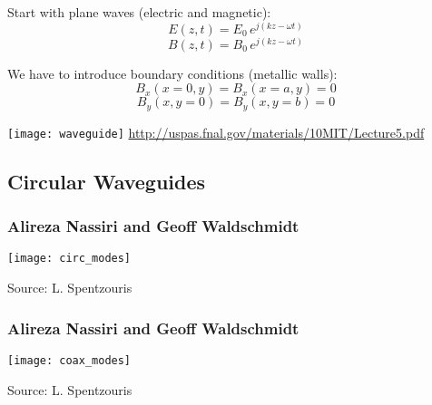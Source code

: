 \documentclass[professionalfonts,t]{beamer}
\begin{document}
\begin{frame}
		Start with plane waves (electric and magnetic):
	\begin{equation}
	E\left(z,t\right) =E_0\,e^{j\left(kz-\omega t\right)}
	\end{equation}
	\begin{equation}
	B\left(z,t\right) =B_0\,e^{j\left(kz-\omega t\right)}
	\end{equation}
\end{frame}

\begin{frame}
	We have to introduce boundary conditions (metallic walls):
		\begin{equation}
			B_x\left(x=0,y\right) = B_x\left(x=a,y\right)= 0
		\end{equation}
		\begin{equation}
			B_y\left(x,y=0\right) = B_y\left(x,y=b\right)=0
		\end{equation}
		
	\vspace{-0.3em}
\centering
\texttt{[image: waveguide]}	
\small\url{http://uspas.fnal.gov/materials/10MIT/Lecture5.pdf}
\end{frame}

\subsection{Circular Waveguides}
\begin{frame}
\frametitle{Alireza Nassiri and Geoff Waldschmidt}
\centering
	\texttt{[image: circ\_modes]}
	
	Source: L. Spentzouris
\end{frame}
\begin{frame}
\frametitle{Alireza Nassiri and Geoff Waldschmidt}
\centering
	\texttt{[image: coax\_modes]}
	\vspace{-1em}
	
	Source: L. Spentzouris
\end{frame}


\end{document}
